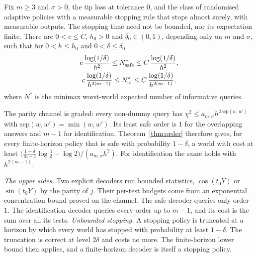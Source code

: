 
\begin{theorem}
\label{thm:endpoint}
Fix $m\ge3$ and $\sigma>0$, the tip loss at tolerance $0$, and the class of randomised adaptive
policies with a measurable stopping rule that stops almost surely, with measurable outputs. The
stopping time need not be bounded, nor its expectation finite. There are $0<c\le C$, $h_{0}>0$
and $\delta_{0}\in(0,1)$, depending only on $m$ and $\sigma$, such that for $0<h\le h_{0}$ and
$0<\delta\le\delta_{0}$
\begin{gather*}
c\,\frac{\log(1/\delta)}{h^{2}}\le N^{*}_{\rm safe}\le C\,\frac{\log(1/\delta)}{h^{2}},\\
c\,\frac{\log(1/\delta)}{h^{2(m-1)}}\le N^{*}_{\rm id}\le C\,\frac{\log(1/\delta)}{h^{2(m-1)}},
\end{gather*}
where $N^{*}$ is the minimax worst-world expected number of informative queries.
\end{theorem}


\begin{theorem}
\label{thm:parlaw}
The parity channel is graded: every non-dummy query has
$\chi^{2}\le a_{m,\sigma}h^{2\,\mathrm{sep}(w,w')}$ with $\mathrm{sep}(w,w')=\min(w,w')$. Its least
safe order is $1$ for the overlapping answers and $m-1$ for identification. Theorem~\ref{thm:order}
therefore gives, for every finite-horizon policy that is safe with probability $1-\delta$, a
world with cost at least
$\bigl(\frac{1-\delta}{m-1}\log\frac1\delta-\log2\bigr)/(a_{m,\sigma}h^{2})$. For identification
the same holds with $h^{2(m-1)}$.
\end{theorem}


\emph{The upper sides.} Two explicit decoders run bounded statistics, $\cos(t_{0}Y)$ or
$\sin(t_{0}Y)$ by the parity of $j$. Their per-test budgets come from an exponential
concentration bound proved on the channel. The safe decoder queries only order $1$. The
identification decoder queries every order up to $m-1$, and its cost is the sum over all its
tests. \emph{Unbounded stopping.} A stopping policy is truncated at a horizon by which every
world has stopped with probability at least $1-\delta$. The truncation is correct at level
$2\delta$ and costs no more. The finite-horizon lower bound then applies, and a finite-horizon
decoder is itself a stopping policy.

